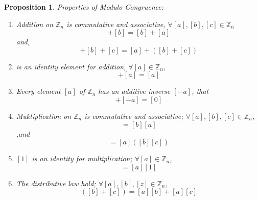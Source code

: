 \documentclass[12pt]{article}
\newtheorem{proposition}{Proposition}[subsection]
\begin{document}
    \begin{proposition}
        Properties of Modulo Congruence:\\
        \begin{enumerate}
            \item Addition on $\mathbb{Z}_n$ is commutative and associative, $\forall [a], [b], [c] \in \mathbb{Z}_n$
                \begin{equation}
                   [a]+[b]=[b]+[a]
                \end{equation}
                and,
                \begin{equation}
                    [a]+[b]+[c] = [a]+([b]+[c])
                \end{equation}
            \item [0] is an identity element for addition, $\forall [a] \in \mathbb{Z}_n$,
                \begin{equation}
                    [0]+[a]=[a]
                \end{equation}
            \item Every element $[a]$ of $\mathbb{Z}_n$ has an additive inverse $[-a]$, that
                \begin{equation}
                    [a] + [-a] = [0]
                \end{equation}

            \item Muktiplication on $\mathbb{Z}_n$ is commutative and associative; $\forall [a], [b], [c] \in \mathbb{Z}_n$,
                \begin{equation}
                    [a][b] = [b][a]
                \end{equation}
                ,and
                \begin{equation}
                    [a][b][c] = [a]([b][c])
                \end{equation}
            \item $[1]$ is an identity for multiplication; $\forall [a] \in \mathbb{Z}_n$,
                \begin{equation}
                    [1][a] = [a][1]
                \end{equation}
            \item The distributive law hold; $\forall [a], [b], [z] \in \mathbb{Z}_n$,
                \begin{equation}
                    [a]([b]+[c]) = [a][b] + [a][c]
                \end{equation}
        \end{enumerate}
    \end{proposition}
\end{document}
